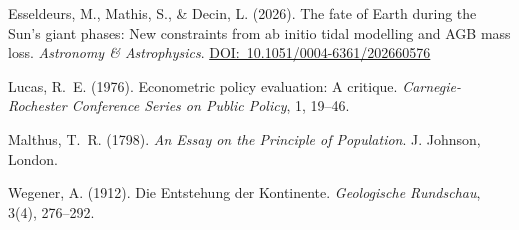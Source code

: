 \documentclass[11pt]{book}
\theoremstyle{plain}
\theoremstyle{definition}
\theoremstyle{remark}
\begin{document}
\begin{sloppypar}
\begin{description}[leftmargin=0pt,itemsep=6pt]

\item Esseldeurs, M., Mathis, S., \& Decin, L. (2026). The fate of Earth during the Sun's giant phases: New constraints from ab initio tidal modelling and AGB mass loss. \textit{Astronomy \& Astrophysics}. \href{https://doi.org/10.1051/0004-6361/202660576}{DOI:~10.1051/0004-6361/202660576}

\item Lucas, R.~E. (1976). Econometric policy evaluation: A critique. \textit{Carnegie-Rochester Conference Series on Public Policy}, 1, 19--46.

\item Malthus, T.~R. (1798). \textit{An Essay on the Principle of Population}. J. Johnson, London.

\item Wegener, A. (1912). Die Entstehung der Kontinente. \textit{Geologische Rundschau}, 3(4), 276--292.

\end{description}
\end{sloppypar}
\end{document}
